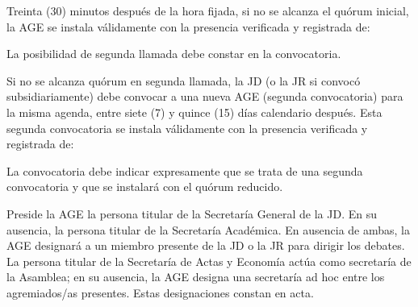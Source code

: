 \documentclass[11pt]{article}
\begin{document}
Treinta (30) minutos después de la hora fijada, si no se alcanza el quórum inicial, la AGE se instala válidamente con la presencia verificada y registrada de:
\begin{artitems}
\end{artitems}
La posibilidad de segunda llamada debe constar en la convocatoria.

Si no se alcanza quórum en segunda llamada, la JD (o la JR si convocó subsidiariamente) debe convocar a una nueva AGE (segunda convocatoria) para la misma agenda, entre siete (7) y quince (15) días calendario después. Esta segunda convocatoria se instala válidamente con la presencia verificada y registrada de:
\begin{artitems}
\end{artitems}
La convocatoria debe indicar expresamente que se trata de una segunda convocatoria y que se instalará con el quórum reducido.

Preside la AGE la persona titular de la Secretaría General de la JD. En su ausencia, la persona titular de la Secretaría Académica. En ausencia de ambas, la AGE designará a un miembro presente de la JD o la JR para dirigir los debates. La persona titular de la Secretaría de Actas y Economía actúa como secretaría de la Asamblea; en su ausencia, la AGE designa una secretaría ad hoc entre los agremiados/as presentes. Estas designaciones constan en acta.
\end{document}
